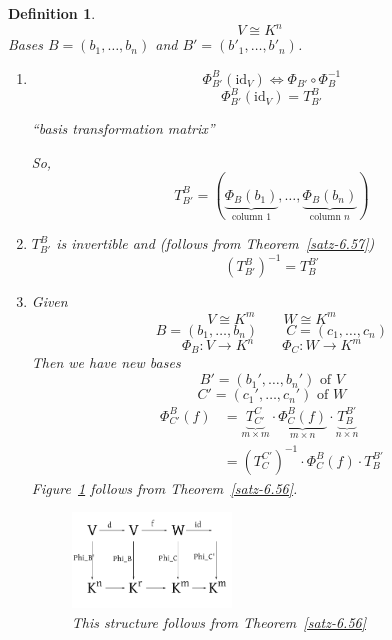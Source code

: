 \documentclass[a4paper,landscape,twocolumn]{article}
\newtheorem{defi}{Definition}[section]
\begin{document}
\begin{defi}
  \label{satz-6.58}
  \[ V \cong K^n \]
  Bases $B = (b_1, \ldots, b_n)$ and $B' = (b'_1, \ldots, b'_n)$.
  \begin{enumerate}
    \item
      \[ \Phi_{B'}^B(\text{id}_V) \iff \Phi_{B'} \circ \Phi_B^{-1} \]
      \[ \Phi_{B'}^B(\text{id}_V) = T_{B'}^B \]
      \begin{center}
        \enquote{basis transformation matrix}
      \end{center}
      So,
      \[ T_{B'}^B = (\underbrace{\Phi_B(b_1)}_{\text{column $1$}}, \ldots, \underbrace{\Phi_B(b_n)}_{\text{column $n$}}) \]
    \item $T_{B'}^B$ is invertible and (follows from Theorem~\ref{satz-6.57})
      \[ \left(T_{B'}^B\right)^{-1} = T_B^{B'} \]
    \item
      Given
      \[ V \cong K^m \qquad W \cong K^m \]
      \[ B = (b_1, \ldots, b_n)  \qquad  C = (c_1, \ldots, c_n)  \]
      \[ \Phi_B:  V \to K^n \qquad \Phi_C: W \to K^m \]
      Then we have new bases
      \[ B' = (b_1', \ldots, b_n') \text{ of } V \]
      \[ C' = (c_1', \ldots, c_n') \text{ of } W \]
      \begin{align*}
        \Phi_{C'}^B(f) &=
          \underbrace{T_{C'}^C}_{m \times m} \cdot
          \underbrace{\Phi_C^B(f)}_{m\times n} \cdot
          \underbrace{T_B^{B'}}_{n\times n} \\
        &= \left(T_C^{C'}\right)^{-1} \cdot \Phi_C^B(f) \cdot T_B^{B'}
      \end{align*}
      Figure~\ref{img:other-2-lin-maps} follows from Theorem~\ref{satz-6.56}.
      \begin{figure}[!h]
        \begin{center}
          \includegraphics[width=0.4\textwidth]{img/other_two_linear_mappings.pdf}
          \caption{This structure follows from Theorem~\ref{satz-6.56}}
          \label{img:other-2-lin-maps}
        \end{center}
      \end{figure}
  \end{enumerate}
\end{defi}
\end{document}
